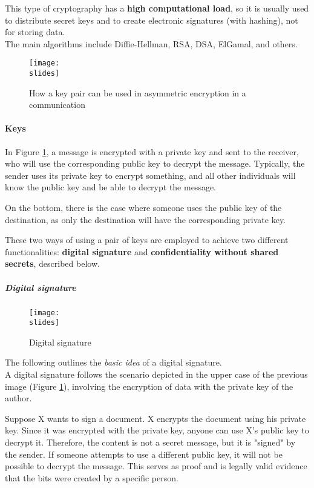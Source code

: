 This type of cryptography has a \textbf{high computational load}, so it is usually used to distribute secret keys and to create electronic signatures (with hashing), not for storing data. \\
The main algorithms include Diffie-Hellman, RSA, DSA, ElGamal, and others.

\begin{figure}[h]
    \centering
    \texttt{[image: \\slides]}
    \caption{How a key pair can be used in asymmetric encryption in a communication}
    \label{fig:asymmcrypto}
\end{figure}

\paragraph{Keys}

In Figure \ref*{fig:asymmcrypto}, a message is encrypted with a private key and sent to the receiver, who will use the corresponding public key to decrypt the message. Typically, the sender uses its private key to encrypt something, and all other individuals will know the public key and be able to decrypt the message.

On the bottom, there is the case where someone uses the public key of the destination, as only the destination will have the corresponding private key.

These two ways of using a pair of keys are employed to achieve two different functionalities: \textbf{digital signature} and \textbf{confidentiality without shared secrets}, described below.



\subparagraph{Digital signature}
\begin{figure}[h]
    \centering
    \texttt{[image: \\slides]}
    \caption{Digital signature}
\end{figure}
The following outlines the \textit{basic idea} of a digital signature.\\
A digital signature follows the scenario depicted in the upper case of the previous image (Figure \ref*{fig:asymmcrypto}),
involving the encryption of data with the private key of the author.

Suppose X wants to sign a document. X encrypts the document using his private key. Since it was encrypted with the private key, anyone can use X's public key to decrypt it. Therefore, the content is not a secret message, but it is "signed" by the sender. If someone attempts to use a different public key, it will not be possible to decrypt the message. This serves as proof and is legally valid evidence that the bits were created by a specific person.

